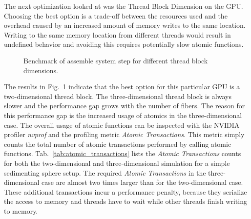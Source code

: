 The next optimization looked at was the Thread Block Dimension on the GPU. Choosing the best option is a trade-off between the resources used and the overhead caused by an increased amount of memory writes to the same location. Writing to the same memory location from different threads would result in undefined behavior and avoiding this requires potentially slow atomic functions.

\begin{figure}[!htbp]
  \centering
  \caption{Benchmark of assemble system step for different thread block dimensions.}
  \label{fig:bench_cuda_thread_blocks}
\end{figure}

The results in Fig.~\ref{fig:bench_cuda_thread_blocks} indicate that the best option for this particular GPU is a two-dimensional thread block. The three-dimensional thread block is always slower and the performance gap grows with the number of fibers. The reason for this performance gap is the increased usage of atomics in the three-dimensional case. The overall usage of atomic functions can be inspected with the NVIDIA profiler \emph{nvprof} and the profiling metric \emph{Atomic Transactions}. This metric simply counts the total number of atomic transactions performed by calling atomic functions. Tab.~\ref{tab:atomic_transactions} lists the \emph{Atomic Transactions} counts for both the two-dimensional and three-dimensional simulation for a simple sedimenting sphere setup. The required \emph{Atomic Transactions} in the three-dimensional case are almost two times larger than for the two-dimensional case. These additional transactions incur a performance penalty, because they serialize the access to memory and threads have to wait while other threads finish writing to memory.

